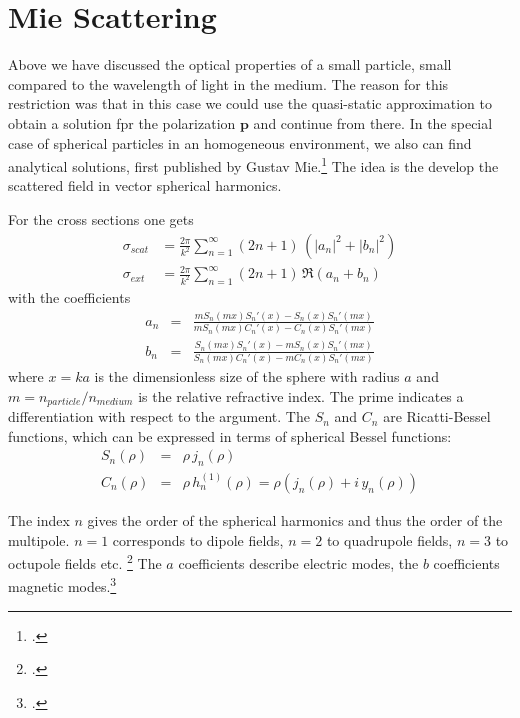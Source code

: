 \section{Mie Scattering}

Above we have discussed the optical properties of a small particle, small compared to the wavelength of light in the medium. The reason for this restriction was that in this case we could use the quasi-static approximation to obtain a solution fpr the polarization $\mathbf{p}$ and continue from there. In the special case of spherical particles in an homogeneous environment, we also can find analytical solutions, first published by Gustav Mie.\footcite[chapter 4]{BH-book} The idea is the develop the scattered field in vector spherical harmonics.

For the cross sections one gets
\begin{eqnarray}
\sigma_{scat} & = \frac{2 \pi }{k^2} \sum\limits_{n=1}^{\infty} (2 n+1) \, \left( |a_n|^2 + |b_n|^2 \right) \\
\sigma_{ext} & = \frac{2 \pi }{k^2} \sum\limits_{n=1}^{\infty} ( 2n+1)\, \Re \left( a_n + b_n \right) 
\end{eqnarray}
%
with the coefficients
%
\begin{eqnarray}
 a_n &= & \frac{m S_n (m x) S_n' (x) - S_n (x) S_n' (m x)}
 {m S_n (m x) C_n' (x) -  C_n (x) S_n' (m x)}  \\
 b_n &=  &\frac{S_n (m x) S_n' (x) - m S_n (x) S_n' (mx)}
  {S_n (mx) C_n' (x) - m C_n (x) S_n' (m x)} 
\end{eqnarray}
where $x =k a $ is the dimensionless size of the sphere with radius $a$ and $m = n_{particle} / n_{medium}$ is the relative refractive index. The prime indicates a differentiation with respect to the argument. The $S_n$ and $C_n$ are Ricatti-Bessel functions, which can be expressed in terms of spherical Bessel functions:
\begin{eqnarray}
S_n ( \rho) & =& \rho \, j_n (\rho) \\
C_n (\rho)  &= & \rho \, h_n^{(1)} (\rho)  = \rho \left(  j_n (\rho)  + i \,  y_n (\rho) \right)
\end{eqnarray}

The index $n$ gives the order of the spherical harmonics and thus the order of the multipole. $n=1$ corresponds to dipole fields, $n=2$ to quadrupole fields, $n=3$ to octupole fields etc. \footcite{KV-book} The $a$ coefficients describe electric modes, the $b$ coefficients magnetic modes.\footcite{KV-book, BH-book} 


